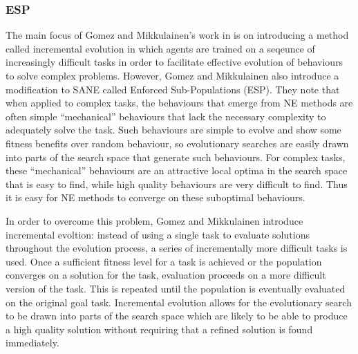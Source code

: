 \documentclass[12pt]{article} %
\begin{document}
\subsubsection{ESP}

The main focus of Gomez and Mikkulainen's work in \cite{Gomez1997} is on introducing a method called incremental evolution in which agents are trained on a seqeunce of increasingly difficult tasks in order to facilitate effective evolution of behaviours to solve complex problems. However, Gomez and Mikkulainen also introduce a modification to SANE called Enforced Sub-Populations (ESP). They note that when applied to complex tasks, the behaviours that emerge from NE methods are often simple ``mechanical'' behaviours that lack the necessary complexity to adequately solve the task. Such behaviours are simple to evolve and show some fitness benefits over random behaviour, so evolutionary searches are easily drawn into parts of the search space that generate such behaviours. For complex tasks, these ``mechanical'' behaviours are an attractive local optima in the search space that is easy to find, while high quality behaviours are very difficult to find. Thus it is easy for NE methods to converge on these suboptimal behaviours.

In order to overcome this problem, Gomez and Mikkulainen introduce incremental evoltion: instead of using a single task to evaluate solutions throughout the evolution process, a series of incrementally more difficult tasks is used. Once a sufficient fitness level for a task is achieved or the population converges on a solution for the task, evaluation proceeds on a more difficult version of the task. This is repeated until the population is eventually evaluated on the original goal task. Incremental evolution allows for the evolutionary search to be drawn into parts of the search space which are likely to be able to produce a high quality solution without requiring that a refined solution is found immediately.
\end{document}
